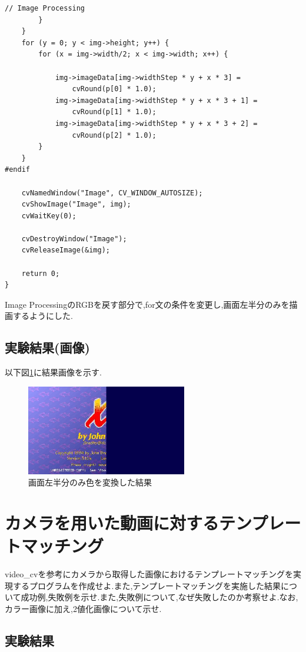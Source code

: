 \documentclass{jarticle}
\begin{document}
\begin{lstlisting}[caption = 画像を左半分のみ色を変換するプログラム,label=code:cvkadai01]
			// Image Processing
		}
	}
	for (y = 0; y < img->height; y++) {
		for (x = img->width/2; x < img->width; x++) {

			img->imageData[img->widthStep * y + x * 3] =
				cvRound(p[0] * 1.0);
			img->imageData[img->widthStep * y + x * 3 + 1] =
				cvRound(p[1] * 1.0);
			img->imageData[img->widthStep * y + x * 3 + 2] =
				cvRound(p[2] * 1.0);
		}
	}
#endif

	cvNamedWindow("Image", CV_WINDOW_AUTOSIZE);
	cvShowImage("Image", img);
	cvWaitKey(0);

	cvDestroyWindow("Image");
	cvReleaseImage(&img);

	return 0;
}
\end{lstlisting}
Image ProcessingのRGBを戻す部分で,for文の条件を変更し,画面左半分のみを描画するようにした.
\subsection{実験結果(画像)}
以下図\ref{fig:cvkadai01}に結果画像を示す.

\begin{figure}[H]
\begin{center}
\includegraphics[width=7.0cm]{cv_kadai01/image.png}
\caption{画面左半分のみ色を変換した結果}
\label{fig:cvkadai01}
\end{center}
\end{figure}


\section{カメラを用いた動画に対するテンプレートマッチング}
video\_cvを参考にカメラから取得した画像におけるテンプレートマッチングを実現するプログラムを作成せよ.また,テンプレートマッチングを実施した結果について成功例,失敗例を示せ.また,失敗例について,なぜ失敗したのか考察せよ.なお,カラー画像に加え,2値化画像について示せ.
\subsection{実験結果}
\end{document}
